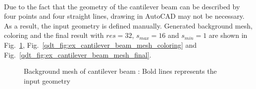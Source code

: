 \paragraph{}
Due to the fact that the geometry of the cantilever beam can be described by four points and four straight lines, drawing in AutoCAD may not be necessary.
As a result, the input geometry is defined manually.
Generated background mesh, coloring and the final result with $res=32$, $s_{max}=16$ and $s_{min}=1$ are shown in Fig.~\ref{qdt_fig:ex_cantilever_beam_background_mesh}, Fig.~\ref{qdt_fig:ex_cantilever_beam_mesh_coloring} and Fig.~\ref{qdt_fig:ex_cantilever_beam_mesh_final}.

    \begin{figure}
        \centering
        \caption[Background mesh of cantilever beam]{Background mesh of cantilever beam : Bold lines represents the input geometry}
        \label{qdt_fig:ex_cantilever_beam_background_mesh}
    \end{figure}

